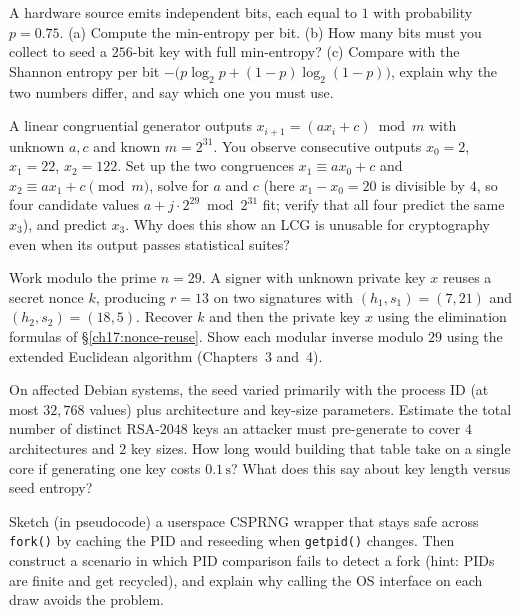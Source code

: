 \begin{exercise}
A hardware source emits independent bits, each equal to $1$ with probability $p = 0.75$. (a) Compute the min-entropy per bit. (b) How many bits must you collect to seed a $256$-bit key with full min-entropy? (c) Compare with the Shannon entropy per bit $-\bigl(p\log_2 p + (1-p)\log_2(1-p)\bigr)$, explain why the two numbers differ, and say which one you must use.
\end{exercise}

\begin{exercise}
A linear congruential generator outputs $x_{i+1} = (a x_i + c) \bmod m$ with unknown $a, c$ and known $m = 2^{31}$. You observe consecutive outputs $x_0 = 2$, $x_1 = 22$, $x_2 = 122$. Set up the two congruences $x_1 \equiv a x_0 + c$ and $x_2 \equiv a x_1 + c \pmod m$, solve for $a$ and $c$ (here $x_1 - x_0 = 20$ is divisible by $4$, so four candidate values $a + j \cdot 2^{29} \bmod 2^{31}$ fit; verify that all four predict the same $x_3$), and predict $x_3$. Why does this show an LCG is unusable for cryptography even when its output passes statistical suites?
\end{exercise}

\begin{exercise}
Work modulo the prime $n = 29$. A signer with unknown private key $x$ reuses a secret nonce $k$, producing $r = 13$ on two signatures with $(h_1, s_1) = (7, 21)$ and $(h_2, s_2) = (18, 5)$. Recover $k$ and then the private key $x$ using the elimination formulas of \S\ref{ch17:nonce-reuse}. Show each modular inverse modulo $29$ using the extended Euclidean algorithm (Chapters~3 and~4).
\end{exercise}

\begin{exercise}
On affected Debian systems, the seed varied primarily with the process ID (at most $32{,}768$ values) plus architecture and key-size parameters. Estimate the total number of distinct RSA-$2048$ keys an attacker must pre-generate to cover $4$ architectures and $2$ key sizes. How long would building that table take on a single core if generating one key costs $0.1\,\text{s}$? What does this say about key length versus seed entropy?
\end{exercise}

\begin{exercise}
Sketch (in pseudocode) a userspace CSPRNG wrapper that stays safe across \texttt{fork()} by caching the PID and reseeding when \texttt{getpid()} changes. Then construct a scenario in which PID comparison fails to detect a fork (hint: PIDs are finite and get recycled), and explain why calling the OS interface on each draw avoids the problem.
\end{exercise}

